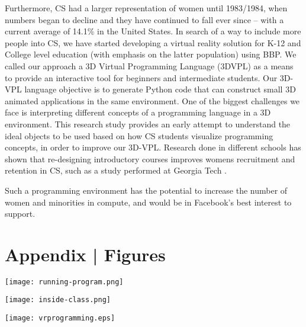 \documentclass[10pt,a4paper]{article}
\begin{document}
\begin{multicols}{2}
Furthermore, CS had a larger representation of women until 1983/1984, when numbers began to decline and they have continued to fall ever since – with a current average of 14.1\% in the United States. In search of a way to include more people into CS, we have started developing a virtual reality solution for K-12 and College level education (with emphasis on the latter population) using BBP. We called our approach a 3D Virtual Programming Language (3DVPL) as a means to provide an interactive tool for beginners and intermediate students. Our 3D-VPL language objective is to generate Python code that can construct small 3D animated applications in the same environment. One of the biggest challenges we face is interpreting different concepts of a programming language in a 3D environment. This research study provides an early attempt to understand the ideal objects to be used based on how CS students visualize programming concepts, in order to improve our 3D-VPL. Research done in different schools has shown that re-designing introductory courses improves womens recruitment and retention in CS, such as a study performed at Georgia Tech \cite{forte}.

Such a programming environment has the potential to increase the number of women and minorities in compute, and would be in Facebook's best interest to support.







\end{multicols}

\section{Appendix | Figures}
\begin{center}
\texttt{[image: running-program.png]}

\vspace{1em}

\texttt{[image: inside-class.png]}

\vspace{1em}


\texttt{[image: vrprogramming.eps]}
\end{center}
\end{document}
